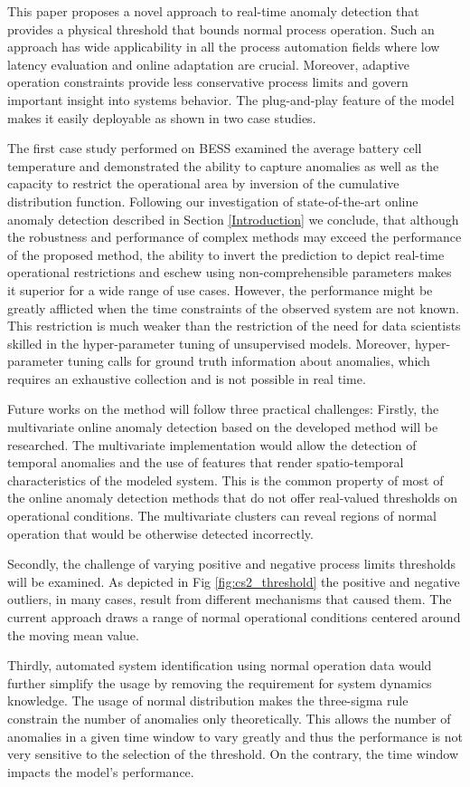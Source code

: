 This paper proposes a novel approach to real-time anomaly detection that provides a physical threshold that bounds normal process operation. Such an approach has wide applicability in all the process automation fields where low latency evaluation and online adaptation are crucial. Moreover, adaptive operation constraints provide less conservative process limits and govern important insight into systems behavior. The plug-and-play feature of the model makes it easily deployable as shown in two case studies. 

The first case study performed on BESS examined the average battery cell temperature and demonstrated the ability to capture anomalies as well as the capacity to restrict the operational area by inversion of the cumulative distribution function. Following our investigation of state-of-the-art online anomaly detection described in Section \ref{Introduction} we conclude, that although the robustness and performance of complex methods may exceed the performance of the proposed method, the ability to invert the prediction to depict real-time operational restrictions and eschew using non-comprehensible parameters makes it superior for a wide range of use cases. However, the performance might be greatly afflicted when the time constraints of the observed system are not known. This restriction is much weaker than the restriction of the need for data scientists skilled in the hyper-parameter tuning of unsupervised models. Moreover, hyper-parameter tuning calls for ground truth information about anomalies, which requires an exhaustive collection and is not possible in real time. 

Future works on the method will follow three practical challenges:
Firstly, the multivariate online anomaly detection based on the developed method will be researched. The multivariate implementation would allow the detection of temporal anomalies and the use of features that render spatio-temporal characteristics of the modeled system. This is the common property of most of the online anomaly detection methods that do not offer real-valued thresholds on operational conditions. The multivariate clusters can reveal regions of normal operation that would be otherwise detected incorrectly.

Secondly, the challenge of varying positive and negative process limits thresholds will be examined. As depicted in Fig \ref{fig:cs2_threshold} the positive and negative outliers, in many cases, result from different mechanisms that caused them. The current approach draws a range of normal operational conditions centered around the moving mean value.

Thirdly, automated system identification using normal operation data would further simplify the usage by removing the requirement for system dynamics knowledge. The usage of normal distribution makes the three-sigma rule constrain the number of anomalies only theoretically. This allows the number of anomalies in a given time window to vary greatly and thus the performance is not very sensitive to the selection of the threshold. On the contrary, the time window impacts the model's performance.